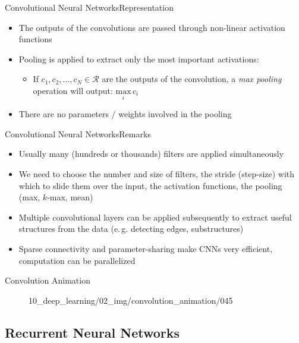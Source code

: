 \begin{frame}{Convolutional Neural Networks}{Representation}
	\begin{itemize}
		\item The outputs of the convolutions are passed through non-linear activation functions
		\item Pooling is applied to extract only the most important activations:
		\begin{itemize}
			\item If $c_1, c_2, \dots, c_N \in \mathcal{R}$ are the outputs of the convolution, a \textit{max pooling} operation will output: $\underset{i}{\text{max}}\, c_i$
		\end{itemize}
		\item There are no parameters / weights involved in the pooling
	\end{itemize}
\end{frame}

\begin{frame}{Convolutional Neural Networks}{Remarks}
	\begin{itemize}
		\item Usually many (hundreds or thousands) filters are applied simultaneously
		\item We need to choose the number and size of filters, the stride (step-size) with which to slide them over the input, the activation functions, the pooling (max, $k$-max, mean)
		\item Multiple convolutional layers can be applied subsequently to extract useful structures from the data (e.\,g. detecting edges, substructures)
		\item Sparse connectivity and parameter-sharing make CNNs very efficient, computation can be parallelized
	\end{itemize}
\end{frame}

\begin{frame}{Convolution Animation}{}
	\begin{figure}
		\centering
			{10_deep_learning/02_img/convolution_animation/}{0}{45}
	\end{figure}
\end{frame}

\subsection{Recurrent Neural Networks}

